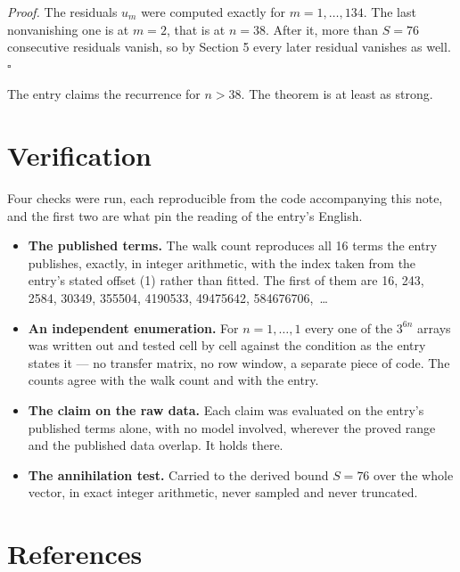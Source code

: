 \documentclass[11pt]{article}
\theoremstyle{definition}
\begin{document}
{\itshape Proof.} The residuals $u_m$ were computed exactly for $m = 1,\dots,134$. The last nonvanishing one is at $m = 2$, that is at $n = 38$. After it, more than $S = 76$ consecutive residuals vanish, so by Section 5 every later residual vanishes as well. $\square$

The entry claims the recurrence for $n > 38$. The theorem is at least as strong.

\section{Verification}

Four checks were run, each reproducible from the code accompanying this note, and the first two are what pin the reading of the entry's English.

\begin{itemize}

\item {\bfseries The published terms.} The walk count reproduces all 16 terms the entry publishes, exactly, in integer arithmetic, with the index taken from the entry's stated offset (1) rather than fitted. The first of them are 16, 243, 2584, 30349, 355504, 4190533, 49475642, 584676706,~\dots

\item {\bfseries An independent enumeration.} For $n = 1,\dots,1$ every one of the $3^{6n}$ arrays was written out and tested cell by cell against the condition as the entry states it --- no transfer matrix, no row window, a separate piece of code. The counts agree with the walk count and with the entry.

\item {\bfseries The claim on the raw data.} Each claim was evaluated on the entry's published terms alone, with no model involved, wherever the proved range and the published data overlap. It holds there.

\item {\bfseries The annihilation test.} Carried to the derived bound $S = 76$ over the whole vector, in exact integer arithmetic, never sampled and never truncated.

\end{itemize}

\section{References}
\end{document}
